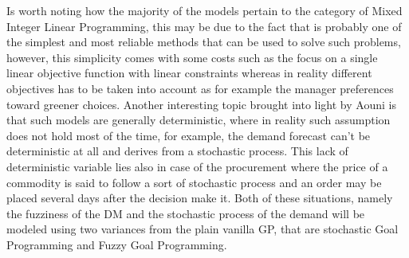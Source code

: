 \documentclass{article}
\begin{document}
  Is worth noting how the majority of the models pertain to the category of Mixed Integer Linear Programming, this may be due to the fact that is probably one of the simplest and most reliable methods that can be used to solve such problems, however, this simplicity comes with some costs such as the focus on a single linear objective function with linear constraints whereas in reality different objectives has to be taken into account as for example the manager preferences toward greener choices. Another interesting topic brought into light by Aouni \cite{azimian_supply_2017} is that such models are generally deterministic, where in reality such assumption does not hold most of the time, for example, the demand forecast can't be deterministic at all and derives from a stochastic process. This lack of deterministic variable lies also in case of the procurement where the price of a commodity is said to follow a sort of stochastic process and an order may be placed several days after the decision make it. Both of these situations, namely the fuzziness of the DM and the stochastic process of the demand will be modeled using two variances from the plain vanilla GP, that are stochastic Goal Programming and Fuzzy Goal Programming. 
\end{document}
